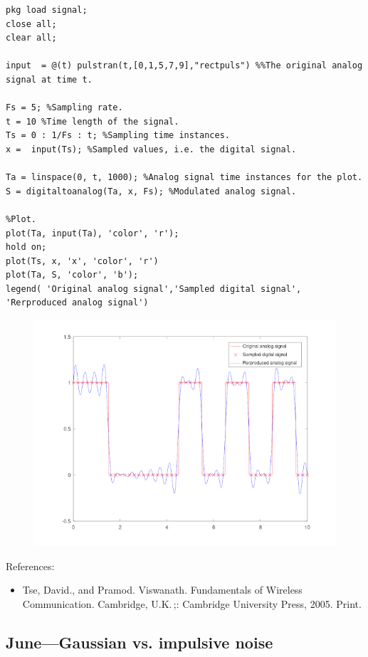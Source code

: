 \documentclass{article}
\begin{document}
\begin{verbatim}
pkg load signal;
close all;
clear all;

input  = @(t) pulstran(t,[0,1,5,7,9],"rectpuls") %%The original analog signal at time t.

Fs = 5; %Sampling rate.
t = 10 %Time length of the signal.
Ts = 0 : 1/Fs : t; %Sampling time instances.
x =  input(Ts); %Sampled values, i.e. the digital signal.

Ta = linspace(0, t, 1000); %Analog signal time instances for the plot.
S = digitaltoanalog(Ta, x, Fs); %Modulated analog signal.

%Plot.
plot(Ta, input(Ta), 'color', 'r');
hold on;
plot(Ts, x, 'x', 'color', 'r')
plot(Ta, S, 'color', 'b');
legend( 'Original analog signal','Sampled digital signal', 'Rerproduced analog signal')

\end{verbatim}

\begin{figure}
  \includegraphics[width=\linewidth]{rectangletrain.png}
\end{figure}



References:
\begin{itemize}
\item 
  Tse, David., and Pramod. Viswanath. Fundamentals of Wireless Communication. Cambridge, U.K. ;: Cambridge University Press, 2005. Print.
\end{itemize}

\subsection{June---Gaussian vs. impulsive noise}
\end{document}
